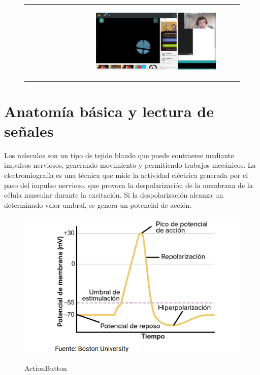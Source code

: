 \begin{figure}[!h]
\begin{tabular}[c]{cc}
\begin{subfigure}[c]{0.5\textwidth}
    \end{subfigure}&
    \begin{subfigure}[c]{0.5\textwidth}
      \includegraphics[width=\textwidth]{imaxes/juego4.png}
      
    \end{subfigure}\\
  \end{tabular}    
 
\end{figure}


\section{Anatomía básica y lectura de señales}
\label{sec:mostra}

Los músculos son un tipo de tejido blando que puede contraerse mediante impulsos nerviosos, generando movimiento y permitiendo trabajos mecánicos. La electromiografía es una técnica que mide la actividad eléctrica generada por el paso del impulso nervioso, que provoca la despolarización de la membrana de la célula muscular durante la excitación. Si la despolarización alcanza un determinado valor umbral, se genera un potencial de acción.\\

\begin{figure}[hp!]
\begin{center}
    \includegraphics[width=1\textwidth]{imaxes/emg.png}
    \caption{ActionButton}
    
    \vspace{1cm}

    \label{ActionButton}
  \end{center}
\end{figure}


